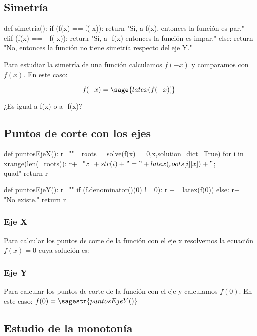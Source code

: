 
\subsection{Simetría}
\begin{sagesilent}
def simetria():
    if (f(x) == f(-x)):
        return "Sí, a f(x), entonces la función es par."
    elif (f(x) == - f(-x)):
        return "Sí, a -f(x) entonces la función es impar."
    else:
        return "No, entonces la función no tiene simetría respecto del eje Y."
\end{sagesilent}

Para estudiar la simetría de una función calculamos $f(-x)$ y comparamos con $f(x)$. 
%
En este caso:

\[f(-x) = \sage{latex(f(-x))}\]

¿Es igual a f(x) o a -f(x)? 

\subsection{Puntos de corte con los ejes}
\begin{sagesilent}
def puntosEjeX():
    r=""
    _roots = solve(f(x)==0,x,solution_dict=True)
    for i in xrange(len(_roots)):
        r+="$x_"+str(i)+" = "+latex(_roots[i][x])+"$;\\quad"
    return r

def puntosEjeY():
    r=""
    if (f.denominator()(0) != 0):
        r += latex(f(0))
    else:
        r+= "No existe."
    return r

\end{sagesilent}

\subsubsection{Eje X}
Para calcular los puntos de corte de la función con el eje x resolvemos la ecuación $f(x) = 0$ cuya solución es: 

\subsubsection{Eje Y}
Para calcular los puntos de corte de la función con el eje y calculamos $f(0)$. 
%
En este caso: $f(0)=\sagestr{puntosEjeY()}$


\subsection{Estudio de la monotonía}

